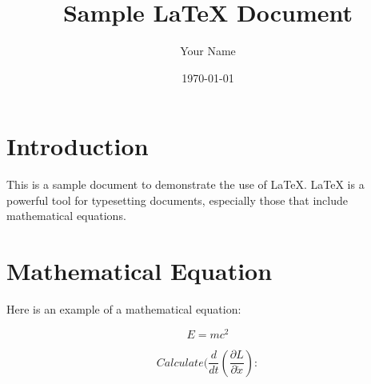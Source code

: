 \documentclass{article}
\title{Sample LaTeX Document}
\author{Your Name}
\date{\today}
\begin{document}
\maketitle

\section{Introduction}
This is a sample document to demonstrate the use of LaTeX. LaTeX is a powerful tool for typesetting documents, especially those that include mathematical equations.

\section{Mathematical Equation}
Here is an example of a mathematical equation:

\begin{equation}
E = mc^2
\end{equation}

\begin{equation}
Calculate ( \frac{d}{dt} \left( \frac{\partial L}{\partial \dot{x}} \right):
\end{equation}
\end{document}
